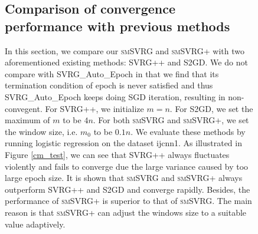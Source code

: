 \documentclass[conference]{IEEEtran}
\begin{document}
\begin{itemize}
\begin{figure}[ht]
\subsection{Comparison of convergence performance with previous methods}
In this section, we compare our \textsc{smSVRG} and \textsc{smSVRG+} with two aforementioned existing methods: SVRG++ and S2GD. We do not compare with SVRG\_Auto\_Epoch in that we find that its termination condition of epoch is never satisfied and  thus SVRG\_Auto\_Epoch keeps doing SGD iteration, resulting in non-convegent. For SVRG++, we initialize $m = n$. For S2GD, we set the maximum of $m$ to be $4n$. For both \textsc{smSVRG} and \textsc{smSVRG+}, we set the window size, i.e. $m_0$ to be $0.1n$. We evaluate these methods by running logistic regression on the dataset ijcnn1. 
As illustrated in Figure \ref{cm_test}, we can see that SVRG++ always fluctuates violently and fails to converge due the large variance caused by too large epoch size. It is shown that \textsc{smSVRG} and \textsc{smSVRG+} always outperform SVRG++ and S2GD and converge rapidly. Besides, the performance of \textsc{smSVRG+} is superior to that of \textsc{smSVRG}. The main reason is that \textsc{smSVRG+} can adjust the windows size to a suitable value adaptively.




\end{figure}
\end{itemize}
\end{document}
